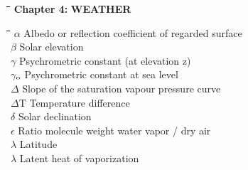 \documentclass[11pt]{article}
\begin{document}
\bigskip
\nwln
\begin{tabbing}
\hspace{1.27cm}\=\hspace{1.27cm}\=\hspace{1.27cm}\=\hspace{1.27cm}\=%
\hspace{1.27cm}\=\hspace{1.27cm}\=\hspace{1.27cm}\=\hspace{1.27cm}\=%
\hspace{1.27cm}\=\hspace{1.27cm}\=\kill
{\bf {\large Chapter 4:}}\> \> \> {\bf {\large WEATHER}}
\end{tabbing}
\nwln
\begin{tabbing}
\hspace{1.27cm}\=\hspace{1.27cm}\=\hspace{1.27cm}\=\hspace{1.27cm}\=%
\hspace{1.27cm}\=\hspace{1.27cm}\=\hspace{1.27cm}\=\hspace{1.27cm}\=%
\hspace{1.27cm}\=\hspace{1.27cm}\=\kill
$\alpha$\> \> Albedo or reflection coefficient of regarded surface\> \> \> \> \> \> \> \> [-]\\
$\beta$\> \> Solar elevation\> \> \> \> \> \> \> \> [degrees]\\
$\gamma$\> \> Psychrometric constant (at elevation z)\> \> \> \> \> \> \> \\
$\gamma$$_{{\rm o}}$\> \> Psychrometric constant at sea level\> \> \> \> \> \> \> \\
$\Delta$\> \> Slope of the saturation vapour pressure curve\> \> \> \> \> \> \> \\
$\Delta$T\> \> Temperature difference\> \> \> \> \> \> \> \> [\degrees C]\\
$\delta$\> \> Solar declination\> \> \> \> \> \> \> \> [degrees]\\
$\epsilon$\> \> Ratio molecule weight water vapor / dry air\> \> \> \> \> \> \> \> [-]\\
$\lambda$\> \> Latitude\> \> \> \> \> \> \> \> [degrees]\\
$\lambda$\> \> Latent heat of vaporization\> \> \> \> \> \> \> \> [MJ kg$^{{\rm -1}}$]\\
$$
\end{tabbing}
\end{document}
